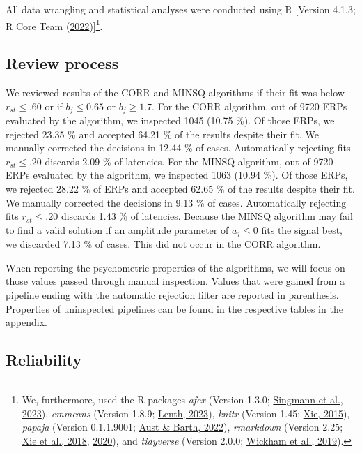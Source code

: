 \documentclass[
  man]{apa7}
\begin{document}
All data wrangling and statistical analyses were conducted using R {[}Version 4.1.3; R Core Team (\protect\hyperlink{ref-R-base}{2022}){]}\footnote{We, furthermore, used the R-packages \emph{afex} (Version 1.3.0; \protect\hyperlink{ref-R-afex}{Singmann et al., 2023}), \emph{emmeans} (Version 1.8.9; \protect\hyperlink{ref-R-emmeans}{Lenth, 2023}), \emph{knitr} (Version 1.45; \protect\hyperlink{ref-R-knitr}{Xie, 2015}), \emph{papaja} (Version 0.1.1.9001; \protect\hyperlink{ref-R-papaja}{Aust \& Barth, 2022}), \emph{rmarkdown} (Version 2.25; \protect\hyperlink{ref-R-rmarkdown_a}{Xie et al., 2018}, \protect\hyperlink{ref-R-rmarkdown_b}{2020}), and \emph{tidyverse} (Version 2.0.0; \protect\hyperlink{ref-R-tidyverse}{Wickham et al., 2019}).}.

\hypertarget{review-process}{%
\subsection{Review process}\label{review-process}}

We reviewed results of the CORR and MINSQ algorithms if their fit was below \(r_{st} \le .60\) or if \(b_j \le 0.65\) or \(b_j \ge 1.7\). For the CORR algorithm, out of 9720 ERPs evaluated by the algorithm, we inspected 1045 (10.75 \%). Of those ERPs, we rejected 23.35 \% and accepted 64.21 \% of the results despite their fit. We manually corrected the decisions in 12.44 \% of cases. Automatically rejecting fits \(r_{st} \le .20\) discards 2.09 \% of latencies. For the MINSQ algorithm, out of 9720 ERPs evaluated by the algorithm, we inspected 1063 (10.94 \%). Of those ERPs, we rejected 28.22 \% of ERPs and accepted 62.65 \% of the results despite their fit. We manually corrected the decisions in 9.13 \% of cases. Automatically rejecting fits \(r_{st} \le .20\) discards 1.43 \% of latencies. Because the MINSQ algorithm may fail to find a valid solution if an amplitude parameter of \(a_j \le 0\) fits the signal best, we discarded 7.13 \% of cases. This did not occur in the CORR algorithm.

When reporting the psychometric properties of the algorithms, we will focus on those values passed through manual inspection. Values that were gained from a pipeline ending with the automatic rejection filter are reported in parenthesis. Properties of uninspected pipelines can be found in the respective tables in the appendix.

\hypertarget{reliability}{%
\subsection{Reliability}\label{reliability}}
\end{document}
